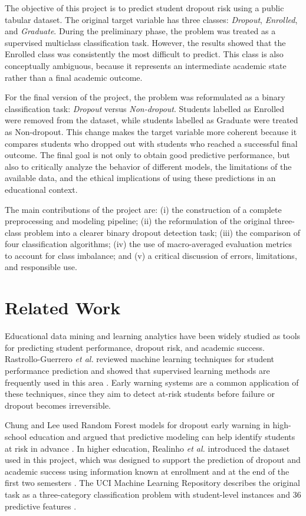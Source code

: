 \documentclass[lettersize,journal]{IEEEtran}
\begin{document}
The objective of this project is to predict student dropout risk using a public tabular dataset. The original target variable has three classes: \emph{Dropout}, \emph{Enrolled}, and \emph{Graduate}. During the preliminary phase, the problem was treated as a supervised multiclass classification task. However, the results showed that the Enrolled class was consistently the most difficult to predict. This class is also conceptually ambiguous, because it represents an intermediate academic state rather than a final academic outcome.

For the final version of the project, the problem was reformulated as a binary classification task: \emph{Dropout} versus \emph{Non-dropout}. Students labelled as Enrolled were removed from the dataset, while students labelled as Graduate were treated as Non-dropout. This change makes the target variable more coherent because it compares students who dropped out with students who reached a successful final outcome. The final goal is not only to obtain good predictive performance, but also to critically analyze the behavior of different models, the limitations of the available data, and the ethical implications of using these predictions in an educational context.

The main contributions of the project are: (i) the construction of a complete preprocessing and modeling pipeline; (ii) the reformulation of the original three-class problem into a clearer binary dropout detection task; (iii) the comparison of four classification algorithms; (iv) the use of macro-averaged evaluation metrics to account for class imbalance; and (v) a critical discussion of errors, limitations, and responsible use.

\section{Related Work}
Educational data mining and learning analytics have been widely studied as tools for predicting student performance, dropout risk, and academic success. Rastrollo-Guerrero \emph{et al.} reviewed machine learning techniques for student performance prediction and showed that supervised learning methods are frequently used in this area \cite{rastrollo2020review}. Early warning systems are a common application of these techniques, since they aim to detect at-risk students before failure or dropout becomes irreversible.

Chung and Lee used Random Forest models for dropout early warning in high-school education and argued that predictive modeling can help identify students at risk in advance \cite{chung2019dropout}. In higher education, Realinho \emph{et al.} introduced the dataset used in this project, which was designed to support the prediction of dropout and academic success using information known at enrollment and at the end of the first two semesters \cite{realinho2022dataset}. The UCI Machine Learning Repository describes the original task as a three-category classification problem with student-level instances and 36 predictive features \cite{uci2021dropout}.
\end{document}

